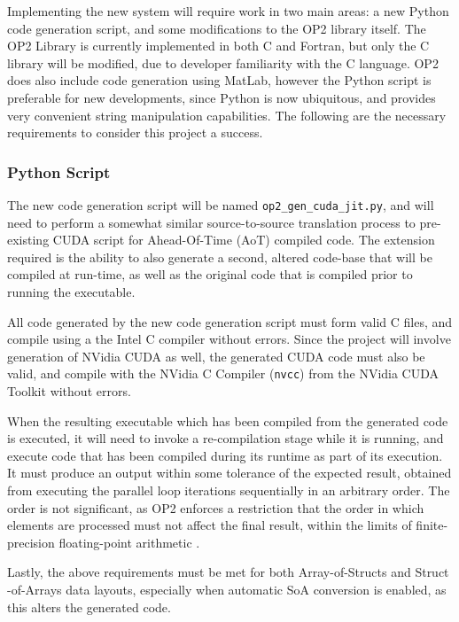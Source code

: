 Implementing the new system will require work in two main areas: a new Python code generation script, and some modifications to the OP2 library itself. The OP2 Library is currently implemented in both C and Fortran, but only the C library will be modified, due to developer familiarity with the C language. OP2 does also include code generation using MatLab, however the Python script is preferable for new developments, since Python is now ubiquitous, and provides very convenient string manipulation capabilities. The following are the necessary requirements to consider this project a success.

\subsubsection{Python Script}
The new code generation script will be named \verb|op2_gen_cuda_jit.py|, and will need to perform a somewhat similar source-to-source translation process to pre-existing CUDA script for Ahead-Of-Time (AoT) compiled code. The extension required is the ability to also generate a second, altered code-base that will be compiled at run-time, as well as the original code that is compiled prior to running the executable.
\par
All code generated by the new code generation script must form valid C files, and compile using a the Intel C compiler \cite{icc} without errors. Since the project will involve generation of NVidia CUDA as well, the generated CUDA code must also be valid, and compile with the NVidia C Compiler (\verb|nvcc|) from the NVidia CUDA Toolkit \cite{nvcc,toolkit} without errors.
\par
When the resulting executable which has been compiled from the generated code is executed, it will need to invoke a re-compilation stage while it is running, and execute code that has been compiled during its runtime as part of its execution. It must produce an output within some tolerance of the expected result, obtained from executing the parallel loop iterations sequentially in an arbitrary order. The order is not significant, as OP2 enforces a restriction that the order in which elements are processed must not affect the final result, within the limits of finite-precision floating-point arithmetic \cite[p3]{op2main}.
\par
Lastly, the above requirements must be met for both Array-of-Structs and Struct\\-of-Arrays data layouts, especially when automatic SoA conversion is enabled, as this alters the generated code.

